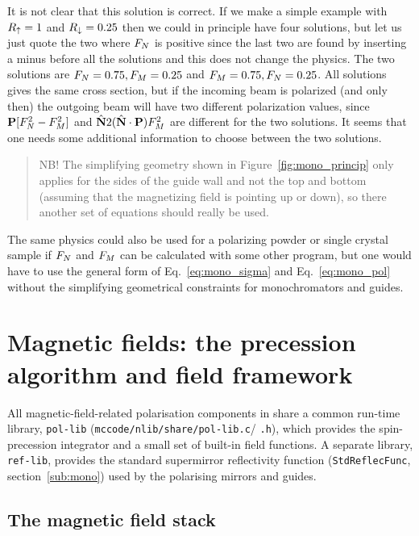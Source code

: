 It is not clear that this solution is correct. If we make a simple example
with $R_\uparrow = 1$ and $R_\downarrow = 0.25$ then we could in principle have four
solutions, but let us just quote the two where $F_N$ is positive since the
last two are found by inserting a minus before all the solutions and this does
not change the physics. The two solutions are $F_N = 0.75, F_M=0.25$ and $F_M
= 0.75, F_N=0.25$. All solutions gives the same cross section, but if the
incoming beam is polarized (and only then) the outgoing beam will have two
different polarization values, since $\mathbf{P} [F_N^2 - F_M^2]$ and $\hat{\mathbf{N}} 2(\hat{\mathbf{N}}
\cdot \mathbf{P})F_M^2$ are different for the two solutions. It seems that one needs
some additional information to choose between the two solutions.

\begin{quote}
  NB! The simplifying geometry shown in Figure~\ref{fig:mono_princip} only
  applies for the sides of the guide wall and not the top and bottom (assuming
  that the magnetizing field is pointing up or down), so there another set of
  equations should really be used.
\end{quote}

The same physics could also be used for a polarizing powder or single crystal
sample if $F_N$ and $F_M$ can be calculated with some other program, but one
would have to use the general form of Eq.~\ref{eq:mono_sigma} and
Eq.~\ref{eq:mono_pol} without the simplifying geometrical constraints for
monochromators and guides.


\section{Magnetic fields: the precession algorithm and field framework}
\label{sec:precession}

All magnetic-field-related polarisation components in \MCS share a common
run-time library, \texttt{pol-lib} (\texttt{mccode/nlib/share/pol-lib.c}\slash
\texttt{.h}), which provides the spin-precession integrator and a small set
of built-in field functions. A separate library, \texttt{ref-lib}, provides
the standard supermirror reflectivity function (\texttt{StdReflecFunc},
section~\ref{sub:mono}) used by the polarising mirrors and guides.

\subsection{The magnetic field stack}
\label{sec:magnetstack}

